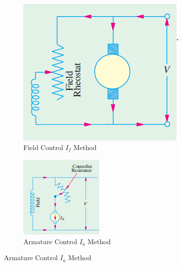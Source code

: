 \documentclass[a4paper,12pt]{article}
\begin{document}
		\begin{figure}[H]
		\centering
		\begin{subfigure}[t]{.48\textwidth}
			\centering
			\includegraphics[width=0.9\linewidth]{Images/1}
			\caption{Field Control $I_f$ Method}
			\vspace{0.5cm}
		\end{subfigure}
		\hfill
		\begin{subfigure}[t]{.48\textwidth}
			\centering
			\includegraphics[width=.9\linewidth]{Images/2}
			\caption{ Armature Control $I_a$ Method }
		\end{subfigure}
		
		
	\end{figure}
\end{document}
